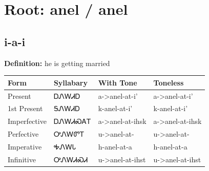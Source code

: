 \documentclass{article}%
\begin{document}
%
\normalsize%
\section*{Root: anel / anel}%
\subsection*{i-a-i}%
\textbf{Definition: }%
he is getting married%
\\[0.5em]%
\begin{tabular}{|l|l|l|l|}%
\hline%
\textbf{Form}&\textbf{Syllabary}&\textbf{With Tone}&\textbf{Toneless}\\%
\hline%
Present&ᎠᏁᎳᏗᎠ&a{-}>anel{-}at{-}i'&a{-}>anel{-}at{-}i'\\%
1st Present&ᎦᏁᎳᏗᎠ&k{-}anel{-}at{-}i'&k{-}anel{-}at{-}i'\\%
Imperfective&ᎠᏁᎳᏗᏍᎪᎢ&a{-}>anel{-}at{-}ihsk&a{-}>anel{-}at{-}ihsk\\%
Perfective&ᎤᏁᎳᏛᎢ&u{-}>anel{-}at{-}&u{-}>anel{-}at{-}\\%
Imperative&ᎭᏁᎳᏓ&h{-}anel{-}at{-}a&h{-}anel{-}at{-}a\\%
Infinitive&ᎤᏁᎳᏗᏍᏗ&u{-}>anel{-}at{-}ihst&u{-}>anel{-}at{-}ihst\\%
\hline%
\end{tabular}%
\\[1em]%
\end{document}
